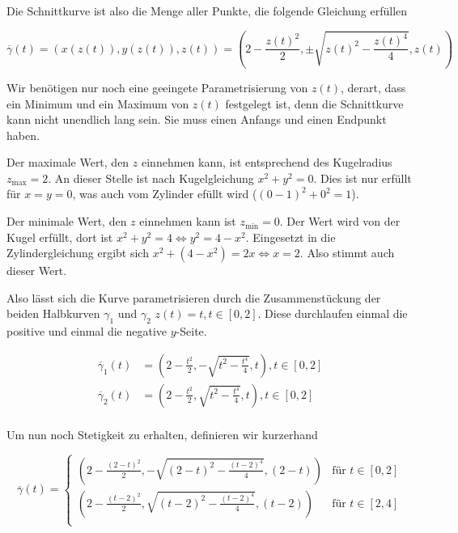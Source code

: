 \documentclass[a4paper,german,12pt,smallheadings]{scrartcl}
\begin{document}
Die Schnittkurve ist also die Menge aller Punkte, die folgende Gleichung erfüllen

\begin{equation*}
  \overline{\gamma}(t) = (x(z(t)), y(z(t)), z(t)) = (2 - \frac{z(t)^2}{2}, \pm \sqrt{z(t)^2 - \frac{z(t)^4}{4}}, z(t))
\end{equation*}

Wir benötigen nur noch eine geeingete Parametrisierung von $z(t)$, derart, dass
ein Minimum und ein Maximum von $z(t)$ festgelegt ist, denn die Schnittkurve
kann nicht unendlich lang sein. Sie muss einen Anfangs und einen Endpunkt
haben.

Der maximale Wert, den $z$ einnehmen kann, ist entsprechend des Kugelradius
$z_\text{max}=2$. An dieser Stelle ist nach Kugelgleichung $x^2+y^2=0$. Dies
ist nur erfüllt für $x=y=0$, was auch vom Zylinder efüllt wird ($(0-1)^2 + 0^2
= 1$).

Der minimale Wert, den $z$ einnehmen kann ist $z_\text{min} = 0$. Der Wert wird
von der Kugel erfüllt, dort ist $x^2 + y^2 = 4 \Leftrightarrow y^2 = 4 - x^2$.
Eingesetzt in die Zylindergleichung ergibt sich $x^2 + (4-x^2) = 2x
\Leftrightarrow x = 2$. Also stimmt auch dieser Wert.

Also lässt sich die Kurve parametrisieren durch die Zusammenstückung der beiden
Halbkurven $\gamma_1$ und $\gamma_2$ $z(t) = t, t \in [0,2]$. Diese durchlaufen
einmal die positive und einmal die negative $y$-Seite.

\begin{align*}
  \overline{\gamma}_1(t) &= \left(2 - \frac{t^2}{2}, -\sqrt{t^2 - \frac{t^4}{4}}, t\right), t \in [0,2] \\
  \overline{\gamma}_2(t) &= \left(2 - \frac{t^2}{2}, \sqrt{t^2 - \frac{t^4}{4}}, t\right), t \in [0,2] \\
\end{align*}

Um nun noch Stetigkeit zu erhalten, definieren wir kurzerhand

\begin{equation*}
  \overline{\gamma}(t) =
  \begin{cases}
    \left(2 - \frac{(2-t)^2}{2}, -\sqrt{(2-t)^2 - \frac{(t-2)^4}{4}}, (2-t)\right) &\mbox{für } t \in [0,2]  \\
    \left(2 - \frac{(t-2)^2}{2}, \sqrt{(t-2)^2 - \frac{(t-2)^4}{4}}, (t-2)\right) &\mbox{für } t \in [2,4]  \\
  \end{cases}
\end{equation*}
\end{document}
